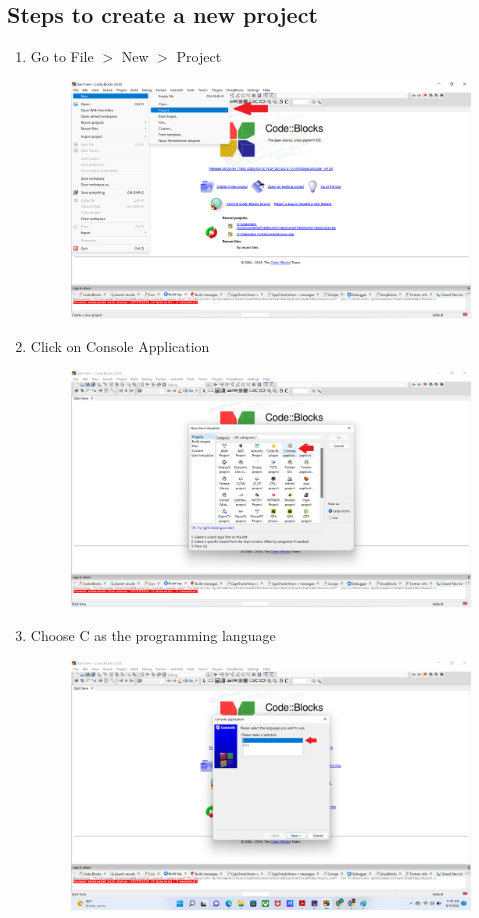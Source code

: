 \subsection{Steps to create a new project}
\begin{enumerate}
\item Go to File $>$ New $>$ Project 
	\begin{figure}[H]
		\centering
		\includegraphics[width=0.7\linewidth]{../P1/img/screenshot002.png}
		\caption{}
		\label{fig:screenshot002}
	\end{figure}
\item Click on Console Application
\begin{figure}[H]
	\centering
	\includegraphics[width=0.7\linewidth]{../P1/img/screenshot004.png}
	\caption{}
	\label{fig:screenshot004}
\end{figure}
\item Choose C as the programming language
\begin{figure}[H]
	\centering
	\includegraphics[width=0.7\linewidth]{../P1/img/screenshot005.png}

\end{figure}
\end{enumerate}
